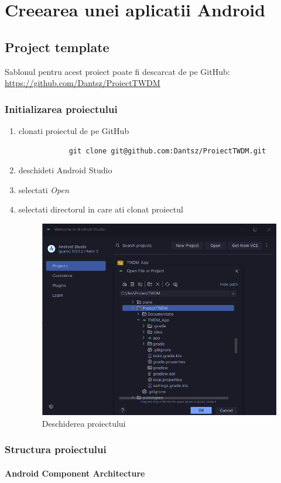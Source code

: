 \section{Creearea unei aplicatii Android}
\subsection{Project template}
Sablonul pentru acest proiect poate fi descarcat de pe GitHub: \url{https://github.com/Dantsz/ProiectTWDM}
\subsubsection{Initializarea proiectului}
\begin{enumerate}
    \item clonati proiectul de pe GitHub
          \begin{lstlisting}
            git clone git@github.com:Dantsz/ProiectTWDM.git
        \end{lstlisting}
    \item deschideti Android Studio
    \item selectati \textit{Open}
    \item selectati directorul in care ati clonat proiectul
          \begin{figure}[H]
              \centering
              \includegraphics[width=0.7\linewidth]{figs/open_project.png}
              \caption{Deschiderea proiectului}
              \label{fig:open_project}
          \end{figure}
\end{enumerate}
\subsubsection{Structura proiectului}
\paragraph{Android Component Architecture}